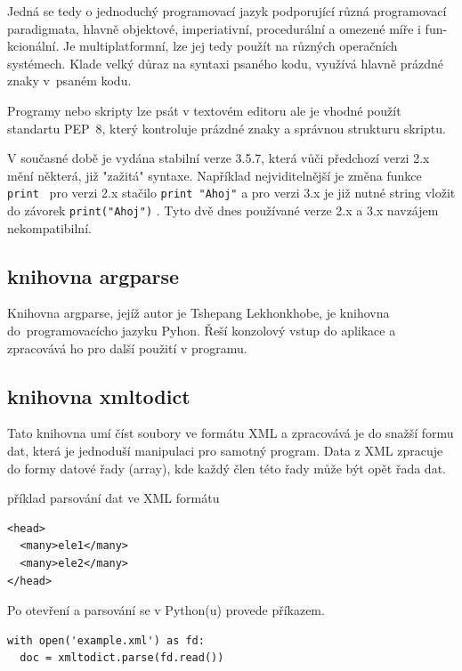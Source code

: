 Jedná se tedy o jednoduchý programovací jazyk podporující různá programovací 
paradigmata, hlavně objektové, imperiativní, procedurální a omezené míře i 
fun- kcionální. Je multiplatformní, lze jej tedy použít na různých operačních 
systémech. Klade velký důraz na syntaxi psaného kodu, využívá hlavně prázdné 
znaky v~psaném kodu.  

Programy nebo skripty lze psát v textovém editoru ale je vhodné použít 
standartu PEP~8, který kontroluje prázdné znaky a správnou strukturu skriptu. 

V současné době je vydána stabilní verze 3.5.7, která vůči předchozí verzi 2.x
mění některá, již "zažitá" syntaxe. Například nejviditelnější je změna funkce 
{\tt print } pro verzi 2.x stačilo  {\tt print "Ahoj"}  a pro verzi 3.x je již
nutné string vložit do závorek  {\tt print("Ahoj")}  . Tyto dvě dnes používané 
verze 2.x a 3.x navzájem nekompatibilní.
\cite{python} 
\cite{wikiPython} 
  
  
\subsection{knihovna argparse}
\label{argparse} 
Knihovna argparse, jejíž autor je Tshepang Lekhonkhobe, je knihovna 
do~programovacícho jazyku Pyhon. Řeší konzolový vstup do aplikace a zpracovává 
ho pro další použití v programu. 


\subsection{knihovna xmltodict}
\label{xmltodict} 
Tato knihovna umí číst soubory ve formátu XML a zpracovává je do snažší formu 
dat, která je jednoduší manipulaci pro samotný program. Data z XML zpracuje
do formy datové řady (array), kde každý člen této řady může být opět řada dat.\cite{xmltodict}

příklad parsování dat ve XML formátu

{\scriptsize
\begin{lstlisting}
<head>
  <many>ele1</many>
  <many>ele2</many>
</head>
\end{lstlisting}
}

Po otevření a parsování se v Python(u) provede příkazem.

{\scriptsize
\lstset{language=Python}
\begin{lstlisting}
with open('example.xml') as fd: 
  doc = xmltodict.parse(fd.read()) 
\end{lstlisting}
}

